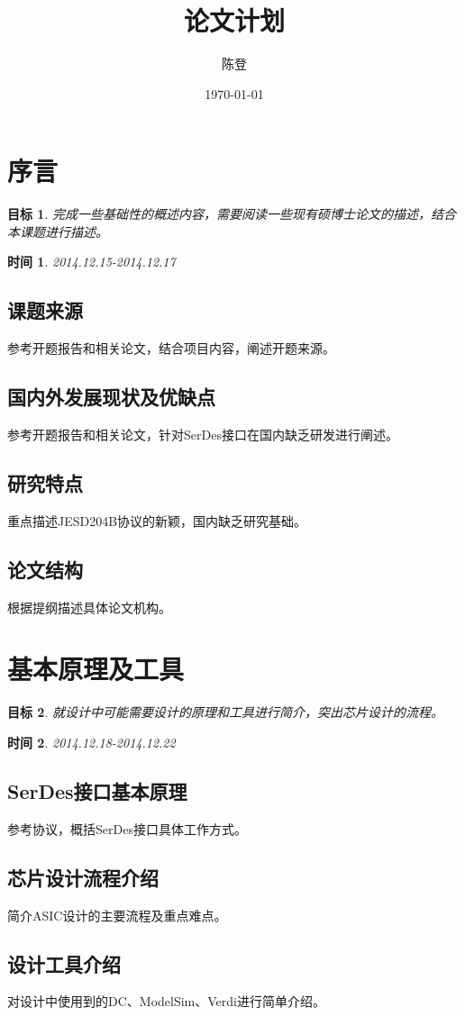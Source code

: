 \documentclass[UTF8]{ctexart}
\title{论文计划}
\author{陈登}
\date{\today}
\newtheorem{aim}{目标}
\newtheorem{deadline}{时间}
\begin{document}
\section{序言}

\begin{aim}{}完成一些基础性的概述内容，需要阅读一些现有硕博士论文的描述，结合本课题进行描述。\end{aim}
\begin{deadline}{}2014.12.15-2014.12.17\end{deadline}

\subsection{课题来源}
参考开题报告和相关论文，结合项目内容，阐述开题来源。
\subsection{国内外发展现状及优缺点}
参考开题报告和相关论文，针对SerDes接口在国内缺乏研发进行阐述。
\subsection{研究特点}
重点描述JESD204B协议的新颖，国内缺乏研究基础。
\subsection{论文结构}
根据提纲描述具体论文机构。

\section{基本原理及工具}

\begin{aim}{}就设计中可能需要设计的原理和工具进行简介，突出芯片设计的流程。\end{aim}
\begin{deadline}{}2014.12.18-2014.12.22\end{deadline}

\subsection{SerDes接口基本原理}
参考协议，概括SerDes接口具体工作方式。
\subsection{芯片设计流程介绍}
简介ASIC设计的主要流程及重点难点。
\subsection{设计工具介绍}
对设计中使用到的DC、ModelSim、Verdi进行简单介绍。
\end{document}
